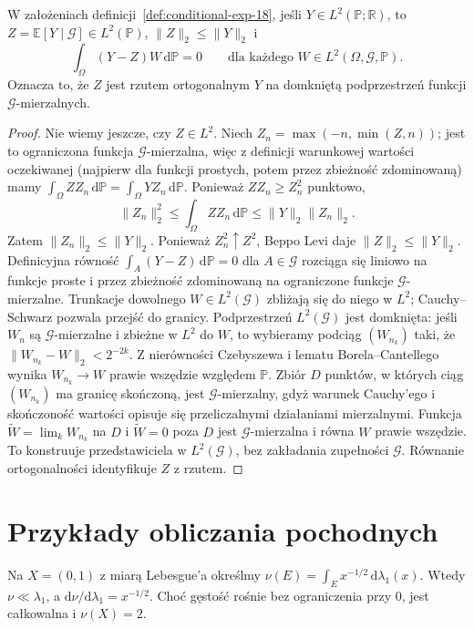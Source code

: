 \begin{twierdzenie}
\label{thm:CE-orthogonal-18}
W założeniach definicji~\ref{def:conditional-exp-18},
jeśli $Y\in L^2(\mathbb P;\mathbb R)$, to
$Z=\mathbb E[Y\mid\mathcal G]\in L^2(\mathbb P)$,
$\|Z\|_2\le\|Y\|_2$ i
\[
\int_\Omega(Y-Z)W\,\mathrm d\mathbb P=0
\qquad\text{dla każdego }W\in L^2(\Omega,\mathcal G,\mathbb P).
\]
Oznacza to, że $Z$ jest rzutem ortogonalnym $Y$
na domkniętą podprzestrzeń funkcji $\mathcal G$-mierzalnych.
\end{twierdzenie}
\begin{proof}
Nie wiemy jeszcze, czy $Z\in L^2$.
Niech $Z_n=\max(-n,\min(Z,n))$; jest to ograniczona
funkcja $\mathcal G$-mierzalna, więc z definicji
warunkowej wartości oczekiwanej (najpierw dla funkcji
prostych, potem przez zbieżność zdominowaną) mamy
$\int_\Omega ZZ_n\,\mathrm d\mathbb P
=\int_\Omega YZ_n\,\mathrm d\mathbb P$.
Ponieważ $ZZ_n\ge Z_n^2$ punktowo,
\[
\|Z_n\|_2^2\le\int_\Omega ZZ_n\,\mathrm d\mathbb P
\le\|Y\|_2\|Z_n\|_2.
\]
Zatem $\|Z_n\|_2\le\|Y\|_2$.
Ponieważ $Z_n^2\uparrow Z^2$, Beppo Levi daje
$\|Z\|_2\le\|Y\|_2$. Definicyjna równość
$\int_A(Y-Z)\,\mathrm d\mathbb P=0$ dla $A\in\mathcal G$
rozciąga się liniowo na funkcje proste i przez
zbieżność zdominowaną na ograniczone funkcje
$\mathcal G$-mierzalne. Trunkacje dowolnego
$W\in L^2(\mathcal G)$ zbliżają się do niego w $L^2$;
Cauchy--Schwarz pozwala przejść do granicy.
Podprzestrzeń $L^2(\mathcal G)$ jest domknięta:
jeśli $W_n$ są $\mathcal G$-mierzalne i zbieżne w $L^2$
do $W$, to wybieramy podciąg $(W_{n_k})$ taki, że
$\|W_{n_k}-W\|_2<2^{-2k}$. Z nierówności
Czebyszewa i lematu Borela--Cantellego wynika
$W_{n_k}\to W$ prawie wszędzie względem $\mathbb P$.
Zbiór $D$ punktów, w których ciąg $(W_{n_k})$
ma granicę skończoną, jest $\mathcal G$-mierzalny,
gdyż warunek Cauchy'ego i skończoność wartości
opisuje się przeliczalnymi działaniami mierzalnymi.
Funkcja $\widetilde W=\lim_kW_{n_k}$ na $D$
i $\widetilde W=0$ poza $D$ jest
$\mathcal G$-mierzalna i równa $W$ prawie wszędzie.
To konstruuje przedstawiciela w $L^2(\mathcal G)$,
bez zakładania zupełności $\mathcal G$.
Równanie ortogonalności identyfikuje $Z$ z rzutem.
\end{proof}

\section{Przykłady obliczania pochodnych}
\begin{przyklad}
Na $X=(0,1)$ z miarą Lebesgue'a określmy
$\nu(E)=\int_E x^{-1/2}\,\mathrm d\lambda_1(x)$.
Wtedy $\nu\ll\lambda_1$, a
$\mathrm d\nu/\mathrm d\lambda_1=x^{-1/2}$.
Choć gęstość rośnie bez ograniczenia przy $0$,
jest całkowalna i $\nu(X)=2$.
\end{przyklad}

